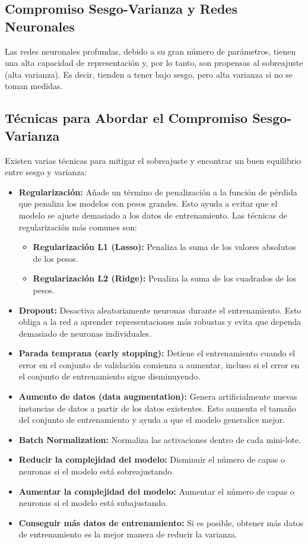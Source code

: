 \documentclass{article}
\begin{document}
\subsection{Compromiso Sesgo-Varianza y Redes Neuronales}

Las redes neuronales profundas, debido a su gran número de parámetros, tienen una alta capacidad de representación y, por lo tanto, son propensas al sobreajuste (alta varianza). Es decir, tienden a tener bajo sesgo, pero alta varianza si no se toman medidas.

\subsection{Técnicas para Abordar el Compromiso Sesgo-Varianza}

Existen varias técnicas para mitigar el sobreajuste y encontrar un buen equilibrio entre sesgo y varianza:

\begin{itemize}
    \item \textbf{Regularización:} Añade un término de penalización a la función de pérdida que penaliza los modelos con pesos grandes.  Esto ayuda a evitar que el modelo se ajuste demasiado a los datos de entrenamiento.  Las técnicas de regularización más comunes son:
        \begin{itemize}
            \item \textbf{Regularización L1 (Lasso):} Penaliza la suma de los valores absolutos de los pesos.
            \item \textbf{Regularización L2 (Ridge):} Penaliza la suma de los cuadrados de los pesos.
        \end{itemize}
    \item \textbf{Dropout:} Desactiva aleatoriamente neuronas durante el entrenamiento.  Esto obliga a la red a aprender representaciones más robustas y evita que dependa demasiado de neuronas individuales.
    \item \textbf{Parada temprana (early stopping):}  Detiene el entrenamiento cuando el error en el conjunto de validación comienza a aumentar, incluso si el error en el conjunto de entrenamiento sigue disminuyendo.
    \item \textbf{Aumento de datos (data augmentation):} Genera artificialmente nuevas instancias de datos a partir de los datos existentes. Esto aumenta el tamaño del conjunto de entrenamiento y ayuda a que el modelo generalice mejor.
     \item \textbf{Batch Normalization:} Normaliza las activaciones dentro de cada mini-lote.
    \item \textbf{Reducir la complejidad del modelo:} Disminuir el número de capas o neuronas si el modelo está sobreajustando.
    \item \textbf{Aumentar la complejidad del modelo:} Aumentar el número de capas o neuronas si el modelo está subajustando.
    \item \textbf{Conseguir más datos de entrenamiento:} Si es posible, obtener más datos de entrenamiento es la mejor manera de reducir la varianza.
\end{itemize}
\end{document}

